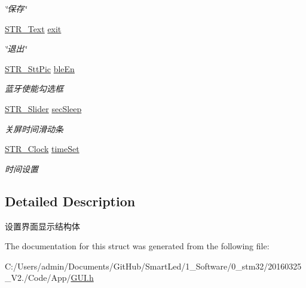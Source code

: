 \begin{DoxyCompactItemize}
\begin{DoxyCompactList}\small\item\em \char`\"{}保存\char`\"{} \end{DoxyCompactList}\item 
\hypertarget{struct_s_t_r___gui_setting_a767aee104b7cfaa75da1d111a915f5ca}{\hyperlink{struct_s_t_r___text}{\-S\-T\-R\-\_\-\-Text} \hyperlink{struct_s_t_r___gui_setting_a767aee104b7cfaa75da1d111a915f5ca}{exit}}\label{struct_s_t_r___gui_setting_a767aee104b7cfaa75da1d111a915f5ca}

\begin{DoxyCompactList}\small\item\em \char`\"{}退出\char`\"{} \end{DoxyCompactList}\item 
\hypertarget{struct_s_t_r___gui_setting_af9d50560aa055904cb8ec7d86e41babf}{\hyperlink{struct_s_t_r___stt_pic}{\-S\-T\-R\-\_\-\-Stt\-Pic} \hyperlink{struct_s_t_r___gui_setting_af9d50560aa055904cb8ec7d86e41babf}{ble\-En}}\label{struct_s_t_r___gui_setting_af9d50560aa055904cb8ec7d86e41babf}

\begin{DoxyCompactList}\small\item\em 蓝牙使能勾选框 \end{DoxyCompactList}\item 
\hypertarget{struct_s_t_r___gui_setting_a62e4bd03fd127672bd76ffc761744071}{\hyperlink{struct_s_t_r___slider}{\-S\-T\-R\-\_\-\-Slider} \hyperlink{struct_s_t_r___gui_setting_a62e4bd03fd127672bd76ffc761744071}{sec\-Sleep}}\label{struct_s_t_r___gui_setting_a62e4bd03fd127672bd76ffc761744071}

\begin{DoxyCompactList}\small\item\em 关屏时间滑动条 \end{DoxyCompactList}\item 
\hypertarget{struct_s_t_r___gui_setting_aa2a1d9462d1b3912d8a67d0844d74379}{\hyperlink{struct_s_t_r___clock}{\-S\-T\-R\-\_\-\-Clock} \hyperlink{struct_s_t_r___gui_setting_aa2a1d9462d1b3912d8a67d0844d74379}{time\-Set}}\label{struct_s_t_r___gui_setting_aa2a1d9462d1b3912d8a67d0844d74379}

\begin{DoxyCompactList}\small\item\em 时间设置 \end{DoxyCompactList}\end{DoxyCompactItemize}


\subsection{\-Detailed \-Description}
设置界面显示结构体 

\-The documentation for this struct was generated from the following file\-:\begin{DoxyCompactItemize}
\item 
\-C\-:/\-Users/admin/\-Documents/\-Git\-Hub/\-Smart\-Led/1\-\_\-\-Software/0\-\_\-stm32/20160325\-\_\-\-V2./\-Code/\-App/\hyperlink{_g_u_i_8h}{\-G\-U\-I.\-h}\end{DoxyCompactItemize}
